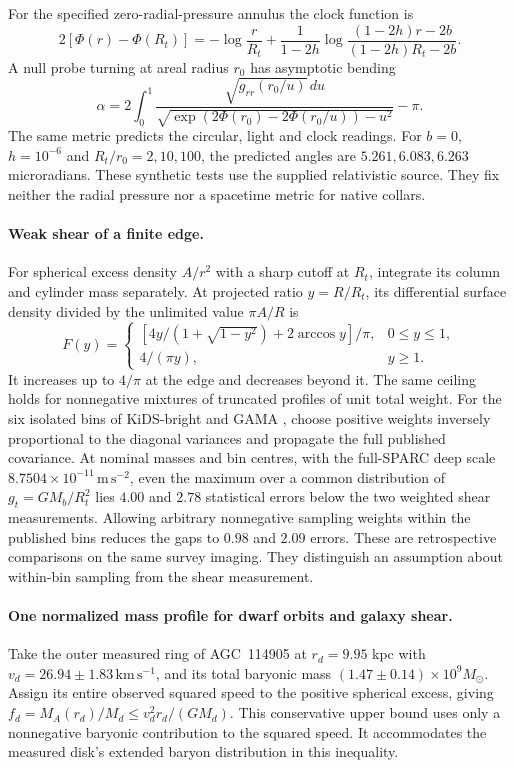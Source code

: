\documentclass[11pt]{article}
\begin{document}
For the specified zero-radial-pressure annulus the clock function is
\[
 2[\Phi(r)-\Phi(R_t)]
   =-\log\frac{r}{R_t}
     +\frac{1}{1-2h}\log\frac{(1-2h)r-2b}{(1-2h)R_t-2b}.
\]
A null probe turning at areal radius $r_0$ has asymptotic bending
\[
 \alpha=2\int_0^1
 \frac{\sqrt{g_{rr}(r_0/u)}\,du}
 {\sqrt{\exp(2\Phi(r_0)-2\Phi(r_0/u))-u^2}}-\pi .
\]
The same metric predicts the circular, light and clock readings. For
$b=0$, $h=10^{-6}$ and $R_t/r_0=2,10,100$, the predicted angles are
$5.261,6.083,6.263$ microradians. These synthetic tests use the
supplied relativistic source. They fix neither the radial pressure nor
a spacetime metric for native collars.

\paragraph{Weak shear of a finite edge.}
For spherical excess density $A/r^2$ with a sharp cutoff at $R_t$,
integrate its column and cylinder mass separately. At projected ratio
$y=R/R_t$, its differential surface density divided by the unlimited
value $\pi A/R$ is
\[
 F(y)=
 \begin{cases}
 [4y/(1+\sqrt{1-y^2})+2\arccos y]/\pi,& 0\le y\le 1,\\
 4/(\pi y),&y\ge1 .
 \end{cases}
\]
It increases up to $4/\pi$ at the edge and decreases beyond it. The
same ceiling holds for nonnegative mixtures of truncated profiles of
unit total weight. For the six isolated bins of KiDS-bright and GAMA
\cite{brouwer2021}, choose positive weights inversely proportional to
the diagonal variances and propagate the full published covariance.
At nominal masses and bin centres, with the full-SPARC deep scale
$8.7504\times10^{-11}\,\mathrm{m\,s^{-2}}$, even the maximum over a
common distribution of $g_t=GM_b/R_t^2$ lies $4.00$ and $2.78$
statistical errors below the two weighted shear measurements.
Allowing arbitrary nonnegative sampling weights within the published
bins reduces the gaps to $0.98$ and $2.09$ errors. These are
retrospective comparisons on the same survey imaging. They distinguish
an assumption about within-bin sampling from the shear measurement.

\paragraph{One normalized mass profile for dwarf orbits and galaxy shear.}
Take the outer measured ring of AGC~114905 at $r_d=9.95$ kpc with
$v_d=26.94\pm1.83\,\mathrm{km\,s^{-1}}$, and its total baryonic
mass $(1.47\pm0.14)\times10^9 M_\odot$. Assign its entire observed
squared speed to the positive spherical excess, giving
$f_d=M_A(r_d)/M_d\le v_d^2r_d/(GM_d)$. This conservative upper
bound uses only a nonnegative baryonic contribution to the squared
speed. It accommodates the measured disk's extended baryon distribution
in this inequality.
\end{document}
